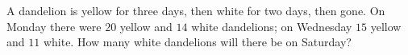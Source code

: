A dandelion is yellow for three days, then white for two days, then gone. On Monday there were $20$ yellow and $14$ white dandelions; on Wednesday $15$ yellow and $11$ white. How many white dandelions will there be on Saturday?
